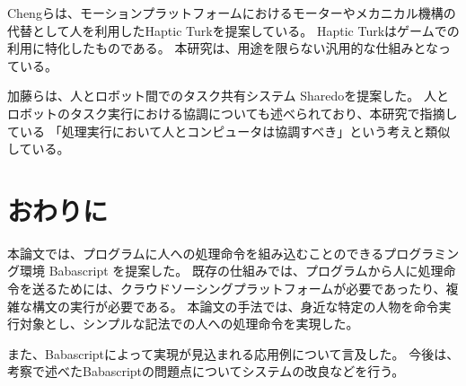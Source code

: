 \documentclass[twoside]{wiss}
\begin{document}
Chengらは、モーションプラットフォームにおけるモーターやメカニカル機構の代替として人を利用したHaptic Turkを提案している\cite{hapticturk}。
Haptic Turkはゲームでの利用に特化したものである。
本研究は、用途を限らない汎用的な仕組みとなっている。

加藤らは、人とロボット間でのタスク共有システム Sharedoを提案した\cite{sharedo}。
人とロボットのタスク実行における協調についても述べられており、本研究で指摘している
「処理実行において人とコンピュータは協調すべき」という考えと類似している。

\section{おわりに}

本論文では、プログラムに人への処理命令を組み込むことのできるプログラミング環境 Babascript を提案した。
既存の仕組みでは、プログラムから人に処理命令を送るためには、クラウドソーシングプラットフォームが必要であったり、複雑な構文の実行が必要である。
本論文の手法では、身近な特定の人物を命令実行対象とし、シンプルな記法での人への処理命令を実現した。

また、Babascriptによって実現が見込まれる応用例について言及した。
今後は、考察で述べたBabascriptの問題点についてシステムの改良などを行う。

{\scriptsize


}
\end{document}

